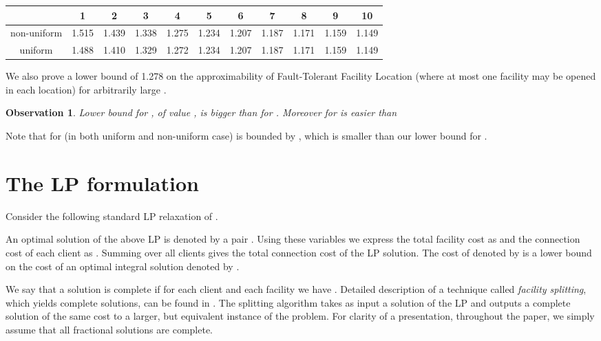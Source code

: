 \documentclass{llncs}
\newtheorem{observation}{\textbf{Observation}}
\begin{document}
\begin{center}
  \begin{tabular}{ c | c | c | c | c | c | c | c | c | c | c }
     & 1 & 2 & 3 & 4 & 5 & 6 & 7 & 8 & 9 & 10 \\ \hline
    non-uniform & 1.515 & 1.439 & 1.338 & 1.275 & 1.234 & 1.207 & 1.187 & 1.171 & 1.159 & 1.149 \\ \hline
    uniform & 1.488 & 1.410 & 1.329 & 1.272 & 1.234 & 1.207 & 1.187 & 1.171 & 1.159 & 1.149 \\
  \end{tabular}
\end{center}

We also prove a lower bound of 1.278 on the approximability of Fault-Tolerant Facility Location (where at most one facility may be opened in each location) for arbitrarily large . 

\begin{observation}
 Lower bound for , of value , is bigger than  for . Moreover for   is easier than 
\end{observation}

Note that  for  (in both uniform and non-uniform case) is bounded by , which is smaller than our lower bound for .

\section{The LP formulation}
\label{the_lp_section}

Consider the following standard LP relaxation of .



An optimal solution of the above LP is denoted by a pair . Using these variables we express the total facility cost as  and the connection cost of each client  as . Summing over all clients gives the total connection cost  of the LP solution. The cost of  denoted by  is a lower bound on the cost of an optimal integral solution denoted by .

We say that a solution is complete if for each client  and each facility  we have . Detailed description of a technique called \textit{facility splitting}, which yields complete solutions, can be found in \cite{Sviridenko}. The splitting algorithm takes as input a solution of the LP and outputs a complete solution of the same cost to a larger, but equivalent instance of the problem. For clarity of a presentation, throughout the paper, we simply assume that all fractional solutions are complete.
\end{document}
